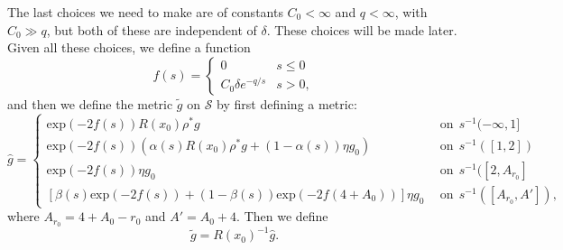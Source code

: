  The last choices we need to make are of
constants $C_0<\infty$ and $q<\infty$, with $C_0 \gg q$, but both of these are
independent of $\delta$. These choices will be made later. Given all these
choices, we define a function
$$f(s)=\begin{cases} 0 & s\le 0 \\ C_0\delta e^{-q/s} & s>0,\end{cases}$$
and then we define the metric $\tilde g$ on ${\mathcal S}$ by first
defining a metric:
$$\hat g=\begin{cases} \mathrm{exp}(-2f(s))R(x_0)\rho^*g & \ \ \mathrm{on} \ \
s^{-1}(-\infty,1] \\
\mathrm{exp}(-2f(s))\left(\alpha(s)R(x_0)\rho^*g+(1-\alpha(s))\eta
g_0\right)  & \ \ \mathrm{on}\ \  s^{-1}([1,2]) \\
\mathrm{exp}(-2f(s))\eta g_0 & \ \ \mathrm{on}\ \ s^{-1}([2,A_{r_0}]\\
\left[\beta(s)\mathrm{exp}(-2f(s))+(1-\beta(s))\mathrm{exp}(-2f(4+A_0))\right]\eta
g_0 & \ \ \mathrm{on} \ \ s^{-1}([A_{r_0},A']),\end{cases}$$ where
$A_{r_0}=4+A_0-r_0$ and $A'=A_0+4$.
 Then we define
$$\widetilde g=R(x_0)^{-1}\hat g.$$








